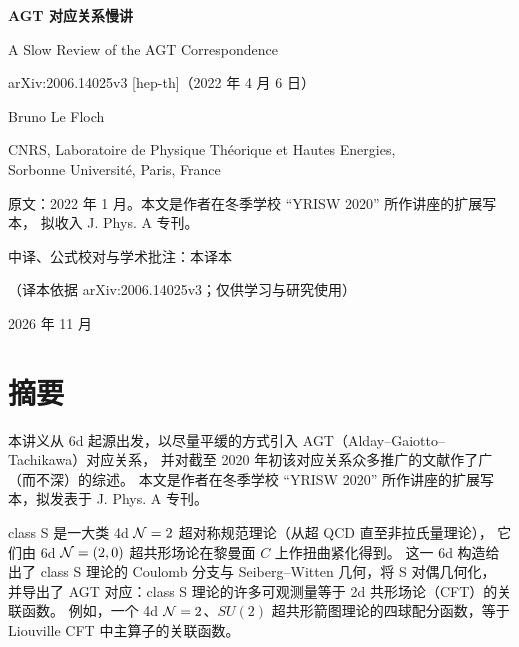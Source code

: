 \thispagestyle{empty}
\begin{center}
\vspace*{2.2cm}

{\LARGE\bfseries AGT 对应关系慢讲\par}
\vspace{0.6cm}
{\large A Slow Review of the AGT Correspondence\par}
\vspace{0.4cm}
{\normalsize arXiv:2006.14025v3 [hep-th]（2022 年 4 月 6 日）\par}

\vspace{1.4cm}
{\large Bruno Le Floch\par}
\vspace{0.25cm}
{\small CNRS, Laboratoire de Physique Théorique et Hautes Energies,\\
Sorbonne Université, Paris, France\par}

\vspace{1.0cm}
{\small 原文：2022 年 1 月。本文是作者在冬季学校 “YRISW 2020” 所作讲座的扩展写本，
拟收入 J. Phys. A 专刊。\par}

\vspace{1.4cm}
{\large 中译、公式校对与学术批注：本译本\par}
\vspace{0.25cm}
{\small（译本依据 arXiv:2006.14025v3；仅供学习与研究使用）\par}

\vfill
{\small 2026 年 11 月\par}
\end{center}
\clearpage

\section*{摘要}

本讲义从 6d 起源出发，以尽量平缓的方式引入 AGT（Alday--Gaiotto--Tachikawa）对应关系，
并对截至 2020 年初该对应关系众多推广的文献作了广（而不深）的综述。
本文是作者在冬季学校 “YRISW 2020” 所作讲座的扩展写本，拟发表于 J. Phys. A 专刊。

class S 是一大类 4d $\mathcal{N}=2$ 超对称规范理论（从超 QCD 直至非拉氏量理论），
它们由 6d $\mathcal{N}=(2,0)$ 超共形场论在黎曼面 $C$ 上作扭曲紧化得到。
这一 6d 构造给出了 class S 理论的 Coulomb 分支与 Seiberg--Witten 几何，将 S 对偶几何化，
并导出了 AGT 对应：class S 理论的许多可观测量等于 2d 共形场论（CFT）的关联函数。
例如，一个 4d $\mathcal{N}=2$、$SU(2)$ 超共形箭图理论的四球配分函数，等于 Liouville CFT 中主算子的关联函数。

